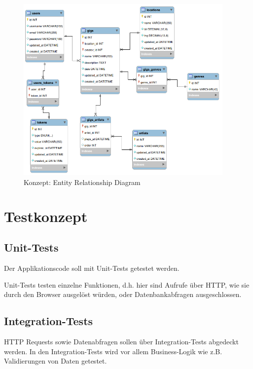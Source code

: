 \begin{figure}[!htb]
  \centering
  \includegraphics[width=0.95\textwidth]{konzept/erd.png}
  \caption{Konzept: Entity Relationship Diagram}
\end{figure}


\clearpage
\section{Testkonzept}\label{testkonzept}

\subsection{Unit-Tests}\label{unittests}

Der Applikationscode soll mit Unit-Tests getestet werden.

Unit-Tests testen einzelne Funktionen, d.h. hier sind Aufrufe über HTTP, wie
sie durch den Browser ausgelöst würden, oder Datenbankabfragen ausgeschlossen.

\subsection{Integration-Tests}\label{integrationtests}

HTTP Requests sowie Datenabfragen sollen über Integration-Tests abgedeckt
werden. In den Integration-Tests wird vor allem Business-Logik wie z.B.
Validierungen von Daten getestet.

